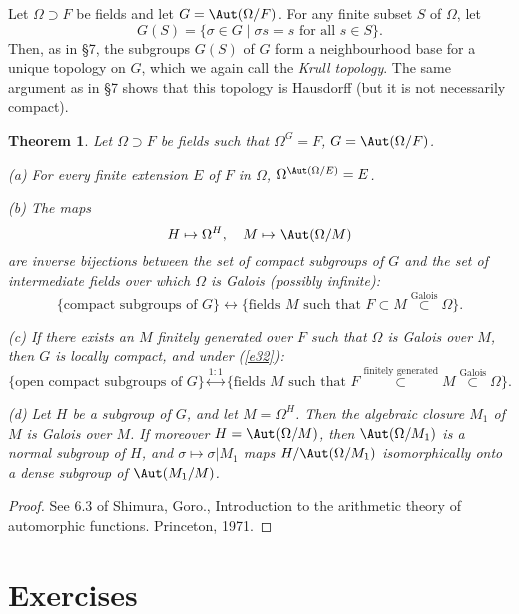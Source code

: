 \documentclass[a4paper,11pt,final,openany]{memoir}
\newtheorem{theorem}[X]{Theorem}
\theoremstyle{nonumberplain}
\newtheorem{proof}{Proof.}
\begin{document}
\addtocounter{X}{1}

Let $\Omega\supset F$ be fields and let $G{}=\Aut(\Omega/F)$. For any finite
subset $S$ of $\Omega$, let%
\[
G{}(S)=\{\sigma\in G{}\mid\sigma s=s\text{ for all }s\in S\}\text{.}%
\]
Then, as in \S 7, the subgroups $G{}(S)$ of $G{}$ form a neighbourhood base
for a unique topology on $G{}$, which we again call the%
\emph{Krull topology}. The same argument as in \S 7 shows that this topology
is Hausdorff (but it is not necessarily compact).

\begin{theorem}
\label{te22}Let $\Omega\supset F$ be fields such that $\Omega^{G{}}=F$,
$G=\Aut(\Omega/F)$.

(a) For every finite extension $E$ of $F$ in $\Omega$, $\Omega^{\Aut(\Omega
/E)}=E$.

(b) The maps%
\begin{equation}
H\mapsto\Omega^{H},\quad M\mapsto\Aut(\Omega/M) \label{e32}%
\end{equation}
are inverse bijections between the set of compact subgroups of $G$ and the set
of intermediate fields over which $\Omega$ is Galois (possibly infinite):%
\[
\{\text{compact subgroups of }G\}\leftrightarrow\{\text{fields }M\text{ such
that }F\subset M\overset{\text{Galois}}{\subset}\Omega\}.
\]


(c) If there exists an $M$ finitely generated over $F$ such that $\Omega$ is
Galois over $M$, then $G$ is locally compact, and under (\ref{e32}):%
\[
\{\text{open compact subgroups of }G\}\overset{1\colon1}{\leftrightarrow
}\{\text{fields }M\text{ such that }F\overset{\text{finitely generated}%
}{\subset}M\overset{\text{Galois}}{\subset}\Omega\}.
\]


(d) Let $H$ be a subgroup of $G$, and let $M=\Omega^{H}$. Then the algebraic
closure $M_{1}$ of $M$ is Galois over $M$. If moreover $H=\Aut(\Omega/M)$,
then $\Aut(\Omega/M_{1})$ is a normal subgroup of $H$, and $\sigma
\mapsto\sigma|M_{1}$ maps $H/\Aut(\Omega/M_{1})$ isomorphically onto a dense
subgroup of $\Aut(M_{1}/M)$.
\end{theorem}

\begin{proof}
See 6.3 of Shimura, Goro., Introduction to the arithmetic theory of
automorphic functions. Princeton, 1971.
\end{proof}

\section{Exercises}
\end{document}
